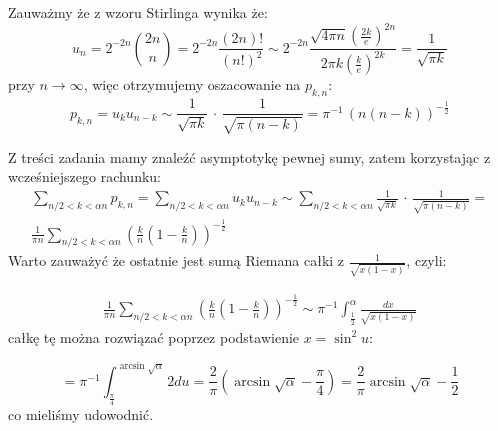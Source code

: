 \documentclass[11pt]{scrartcl}
\begin{document}
    Zauważmy że z wzoru Stirlinga wynika że:
    \[
        u_n = 2^{-2n} \binom{2n}{n} = 2^{-2n} \frac{(2n)!}{(n!)^2} \sim 
        2^{-2n} \frac{ \sqrt{4 \pi n} \left ( \frac{2k}{e} \right )^{2n}}
            {2 \pi k \left ( \frac{k}{e} \right )^{2k}}
        = \frac{1}{\sqrt{\pi k} }
    \]
    przy $n \to \infty$, więc otrzymujemy oszacowanie na $p_{k,n}$:
    \[
            p_{k,n} = 
            u_k u_{n-k} \sim
            \frac{1}{\sqrt{\pi k} } \, \cdot \, \frac{1}{\sqrt{\pi (n-k)} } =
            \pi^{-1} \, \left( n (n - k) \right)^{-\frac{1}{2}}
    \]

    Z treści zadania mamy znaleźć asymptotykę pewnej sumy, 
    zatem korzystając z wcześniejszego rachunku:
    \begin{gather*}
            \sum_{n/2 < k < \alpha n} p_{k,n} = 
            \sum_{n/2 < k < \alpha n} u_k u_{n-k} \sim
            \sum_{n/2 < k < \alpha n} \frac{1}{\sqrt{\pi k} } \, 
                \cdot \, \frac{1}{\sqrt{\pi (n-k)} } = \\
            \frac{1}{\pi n} \sum_{n/2 < k < \alpha n} 
                \left( \frac{k}{n} (1 - \frac{k}{n}) \right)^{-\frac{1}{2}}
    \end{gather*}
    Warto zauważyć że ostatnie jest sumą Riemana całki z $\frac{1}{\sqrt{x(1 - x)}}$, czyli:

    \begin{gather*}
         \frac{1}{\pi n} \sum_{n/2 < k < \alpha n} 
             \left( \frac{k}{n} (1 - \frac{k}{n}) \right)^{-\frac{1}{2}} \sim
             \pi^{-1} \int_{\frac{1}{2}}^{\alpha} \frac{dx}{\sqrt{x(1-x)} }
    \end{gather*}
    całkę tę można rozwiązać poprzez podstawienie $x = \sin^2 u$:

    \[
        = \pi^{-1} \int_{\frac{\pi }{4}}^{\arcsin \sqrt{\alpha }} 2 du =
        \frac{2}{\pi } \left ( \arcsin \sqrt{\alpha }  - \frac{\pi }{4} \right ) = 
        \frac{2}{\pi } \arcsin \sqrt{\alpha } - \frac{1}{2}
    \]
    co mieliśmy udowodnić.
\end{document}
